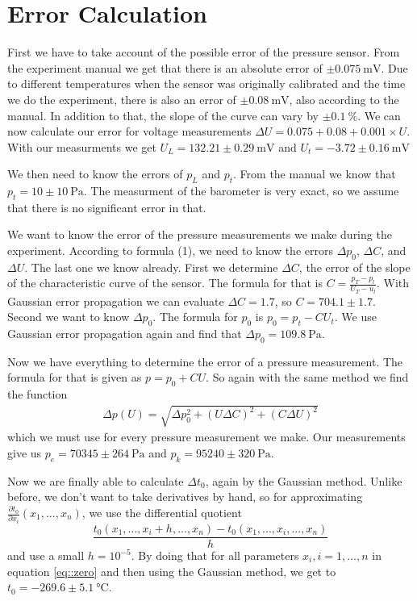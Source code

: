 \section{Error Calculation}
First we have to take account of the possible error of the pressure sensor. From the experiment manual we get that there is an absolute error of $\pm\SI{0.075}{\milli\volt}$.
Due to different temperatures when the sensor was originally calibrated and the time we do the experiment, there is also an error of $\pm\SI{0.08}{\milli\volt}$, also according to the manual. 
In addition to that, the slope of the curve can vary by $\pm\SI{0.1}{\percent}$. 
We can now calculate our error for voltage measurements $\Delta U = 0.075 + 0.08 + 0.001 \times U$. 
With our measurments we get $U_L = 132.21 \pm \SI{0.29}{\milli\volt}$ and $U_t = -3.72 \pm \SI{0.16}{\milli\volt}$

We then need to know the errors of $p_L$ and $p_t$. 
From the manual we know that $p_t = 10 \pm \SI{10}{\pascal}$.
The measurment of the barometer is very exact, so we assume that there is no significant error in that. 

We want to know the error of the pressure measurements we make during the experiment. 
According to formula (1), we need to know the errors $\Delta p_0$, $\Delta C$, and $\Delta U$. 
The last one we know already.
First we determine $\Delta C$, the error of the slope of the characteristic curve of the sensor. 
The formula for that is $C = \frac{p_T - p_l}{U_T - u_l}$. With Gaussian error propagation we can evaluate $\Delta C = 1.7$, so $C = 704.1 \pm 1.7$.
Second we want to know $\Delta p_0$. 
The formula for $p_0$ is $p_0 = p_t - C U_t$.
We use Gaussian error propagation again and find that $\Delta p_0 = \SI{109.8}{\pascal}$.

Now we have everything to determine the error of a pressure measurement. 
The formula for that is given as $p = p_0 + C U$. 
So again with the same method we find the function 
\begin{align}
	\Delta p(U) = \sqrt{\Delta p_0^2 + (U \Delta C)^2 + (C \Delta U)^2}
\end{align}\label{eq:err1}
which we must use for every pressure measurement we make. 
Our measurements give us $p_e = 70345 \pm \SI{264}{\pascal}$ and $p_k = 95240 \pm \SI{320}{\pascal}$.

Now we are finally able to calculate $\Delta t_0$, again by the Gaussian method. 
Unlike before, we don't want to take derivatives by hand, so for approximating $\frac{\partial t_0}{\partial x_i}(x_1, ..., x_n)$, we use the differential quotient
\[ \frac{t_0(x_1,..., x_i+h,...,x_n) - t_0(x_1,..., x_i,...,x_n)}{h} \]
 and use a small $h = 10^{-5}$. By doing that for all parameters $x_i, i = 1,...,n$
in equation \ref{eq::zero} and then using the Gaussian method, we get to $t_0 = -269.6 \pm \SI{5.1}{\degreeCelsius}$.